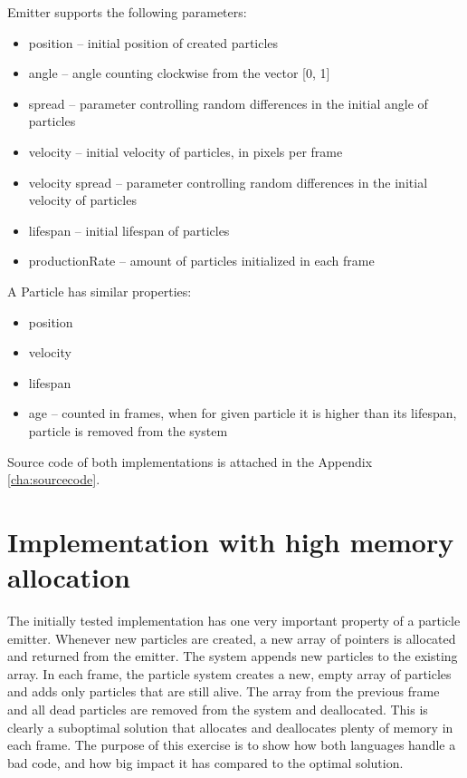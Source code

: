 Emitter supports the following parameters:

\begin{itemize}
	\item position -- initial position of created particles
	\item angle -- angle counting clockwise from the vector [0, 1]
	\item spread -- parameter controlling random differences in the initial angle of particles
	\item velocity -- initial velocity of particles, in pixels per frame
	\item velocity spread -- parameter controlling random differences in the initial velocity of particles
	\item lifespan -- initial lifespan of particles
	\item productionRate -- amount of particles initialized in each frame
\end{itemize}

A Particle has similar properties:
\begin{itemize}
	\item position
	\item velocity
	\item lifespan
	\item age -- counted in frames, when for given particle it is higher than its lifespan, particle is removed from the system
\end{itemize}

Source code of both implementations is attached in the Appendix \ref{cha:sourcecode}.

\section{Implementation with high memory allocation}
\label{sec:particlesinitial}

The initially tested implementation has one very important property of a particle emitter. Whenever new particles are created, a new array of pointers is allocated and returned from the emitter. The system appends new particles to the existing array. In each frame, the particle system creates a new, empty array of particles and adds only particles that are still alive. The array from the previous frame and all dead particles are removed from the system and deallocated. This is clearly a suboptimal solution that allocates and deallocates plenty of memory in each frame. The purpose of this exercise is to show how both languages handle a bad code, and how big impact it has compared to the optimal solution.

